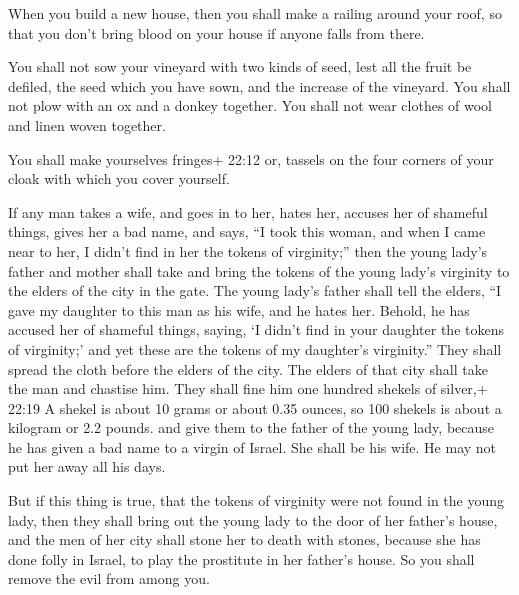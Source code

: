 When you build a new house, then you shall make a railing
around your roof, so that you don't bring blood on your house if anyone
falls from there.

 You shall not sow your vineyard with two kinds of seed,
lest all the fruit be defiled, the seed which you have sown, and the
increase of the vineyard.  You shall not plow with an ox
and a donkey together.  You shall not wear clothes of wool
and linen woven together.

 You shall make yourselves fringes+ 22:12 or, tassels on
the four corners of your cloak with which you cover yourself.

 If any man takes a wife, and goes in to her, hates her,
 accuses her of shameful things, gives her a bad name, and
says, ``I took this woman, and when I came near to her, I didn't find in
her the tokens of virginity;''  then the young lady's
father and mother shall take and bring the tokens of the young lady's
virginity to the elders of the city in the gate.  The young
lady's father shall tell the elders, ``I gave my daughter to this man as
his wife, and he hates her.  Behold, he has accused her of
shameful things, saying, `I didn't find in your daughter the tokens of
virginity;' and yet these are the tokens of my daughter's virginity.''
They shall spread the cloth before the elders of the city. 
The elders of that city shall take the man and chastise him.
 They shall fine him one hundred shekels of silver,+ 22:19
A shekel is about 10 grams or about 0.35 ounces, so 100 shekels is about
a kilogram or 2.2 pounds. and give them to the father of the young lady,
because he has given a bad name to a virgin of Israel. She shall be his
wife. He may not put her away all his days.

 But if this thing is true, that the tokens of virginity
were not found in the young lady,  then they shall bring
out the young lady to the door of her father's house, and the men of her
city shall stone her to death with stones, because she has done folly in
Israel, to play the prostitute in her father's house. So you shall
remove the evil from among you.

